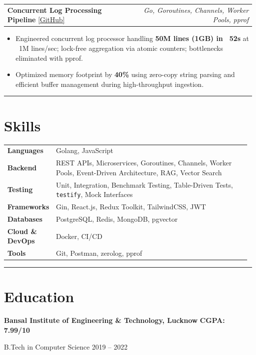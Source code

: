 \documentclass[9pt,a4paper]{article}
\begin{document}
\vspace{2pt}

\begin{tabular*}{\linewidth}{l@{\extracolsep{\fill}}r}
\textbf{Concurrent Log Processing Pipeline} \href{https://github.com/Narvdeshwar/go-logstreamer}{{\small\color{myblue}[GitHub]}} & \textit{Go, Goroutines, Channels, Worker Pools, pprof}
\end{tabular*}

\begin{itemize}
\item Engineered concurrent log processor handling \textbf{50M lines (1GB) in ~52s} at ~1M lines/sec; lock-free aggregation via atomic counters; bottlenecks eliminated with pprof.
\item Optimized memory footprint by \textbf{40\%} using zero-copy string parsing and efficient buffer management during high-throughput ingestion.
\end{itemize}

\vspace{3pt}
{\color{myblue}\hrule}

\section*{Skills}

\begin{tabular}{p{0.16\linewidth} p{0.82\linewidth}}
\textbf{Languages}       & Golang, JavaScript \\
\textbf{Backend}         & REST APIs, Microservices, Goroutines, Channels, Worker Pools, Event-Driven Architecture, RAG, Vector Search \\
\textbf{Testing}         & Unit, Integration, Benchmark Testing, Table-Driven Tests, \texttt{testify}, Mock Interfaces \\
\textbf{Frameworks}      & Gin, React.js, Redux Toolkit, TailwindCSS, JWT \\
\textbf{Databases}       & PostgreSQL, Redis, MongoDB, pgvector \\
\textbf{Cloud \& DevOps} & Docker, CI/CD \\
\textbf{Tools}           & Git, Postman, zerolog, pprof \\
\end{tabular}

\vspace{3pt}
{\color{myblue}\hrule}

\section*{Education}
\textbf{Bansal Institute of Engineering \& Technology, Lucknow} \hfill \textbf{CGPA: 7.99/10}

B.Tech in Computer Science \hfill 2019 -- 2022
\end{document}
